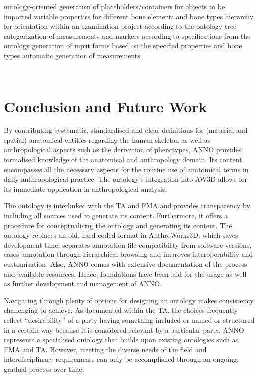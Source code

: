 \documentclass[sw]{iosart2x}
\newcommand{\aw}{AnthroWorks3D}
\begin{document}
ontology-oriented generation of placeholders/containers for objects to be imported
variable properties for different bone elements and bone types
hierarchy for orientation within an examination project according to the ontology tree
categorization of measurements and markers according to specifications from the ontology
generation of input forms based on the specified properties and bone types
automatic generation of measurements

~\citep{rickview}
\section{Conclusion and Future Work}

By contributing systematic, standardised and clear definitions for (material and spatial) anatomical entities regarding the human skeleton as well as anthropological aspects such as the derivation of phenotypes, ANNO provides formalised knowledge of the anatomical and anthropology domain.
Its content encompasses all the necessary aspects for the routine use of anatomical terms in daily anthropological practice.
The ontology’s integration into AW3D allows for its immediate application in anthropological analysis.

The ontology is interlinked with the TA and FMA and provides transparency by including all sources used to generate its content.
Furthermore, it offers a procedure for conceptualising the ontology and generating its content.
The ontology replaces an old, hard-coded format in \aw{}, which saves development time, separates annotation file compatibility from software versions, eases annotation through hierarchical browsing and improves interoperability and customisation.
Also, ANNO comes with extensive documentation of the process and available resources.
Hence, foundations have been laid for the usage as well as further development and management of ANNO.

Navigating through plenty of options for designing an ontology makes consistency challenging to achieve.
As documented within the TA, the choices frequently reflect “desirability” of a party having something included or named or structured in a certain way because it is considered relevant by a particular party.
ANNO represents a specialised ontology that builds upon existing ontologies such as FMA and TA.
However, meeting the diverse needs of the field and interdisciplinary requirements can only be accomplished through an ongoing, gradual process over time.
\end{document}
